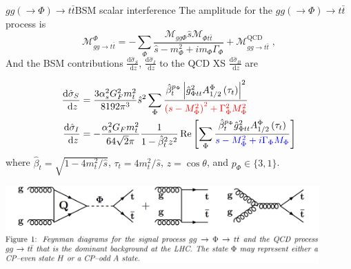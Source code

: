\documentclass{../bredelebeamer}
\begin{document}
\begin{frame}{$gg (\rightarrow \Phi) \longrightarrow t\bar t$}{BSM scalar interference}
    The amplitude for the $gg (\rightarrow \Phi) \longrightarrow t\bar t$ process is
    \begin{equation}
        \mathcal{M}_{gg\rightarrow t \bar t}^\Phi = -\sum_\Phi \frac{\mathcal M_{gg\Phi} \hat s \mathcal M_{\Phi t\bar t}}{\hat s - m_\Phi^2 + i m_\Phi \Gamma_\Phi} + \mathcal M_{gg\rightarrow t\bar t}^\text{QCD}\;,
    \end{equation}
    And the BSM contributions $\frac{\mathrm{d} \hat{\sigma}_S}{\mathrm{~d} z}$, $\frac{\mathrm{d} \hat{\sigma}_I}{\mathrm{~d} z}$ to the QCD XS $\frac{\mathrm{d} \hat{\sigma}_B}{\mathrm{~d} z}$ are

        \begin{equation}
            \begin{aligned}
            \frac{\mathrm{d} \hat{\sigma}_S}{\mathrm{~d} z} & =\frac{3 \alpha_s^2 G_F^2 m_t^2}{8192 \pi^3} \hat{s}^2 \sum_{\Phi} \frac{\hat{\beta}_t^{p_\Phi}\left|\hat{g}_{\Phi t t}^2 A_{1 / 2}^{\Phi}\left(\tau_t\right)\right|^2}{\textcolor{red}{\left(s-M_{\Phi}^2\right)^2+\Gamma_{\Phi}^2 M_{\Phi}^2}} \\
            \frac{\mathrm{d} \hat{\sigma}_I}{\mathrm{~d} z} & 
            =-\frac{\alpha_s^2 G_F m_t^2}{64 \sqrt{2} \pi} \frac{1}{1-\hat{\beta}_t^2 z^2} \operatorname{Re}\left[\sum_{\Phi} \frac{\hat{\beta}_t^{p_{\Phi}} \hat{g}_{\Phi t t}^2 A_{1 / 2}^{\Phi}\left(\tau_t\right)}{\textcolor{blue}{s-M_{\Phi}^2+i \Gamma_{\Phi} M_{\Phi}}}\right]
            \end{aligned}\notag
        \end{equation}
        where $\hat{\beta}_t = \sqrt{1-4m_t^2/\hat{s}}$, $\tau_t = 4m_t^2/\hat{s}$, $z = \cos\theta$, and $p_\Phi \in \{3,1\}$.
    \begin{center}
        \includegraphics[width=0.9\textwidth]{gg_ttbar.png}
    \end{center}
\end{frame}
\end{document}
